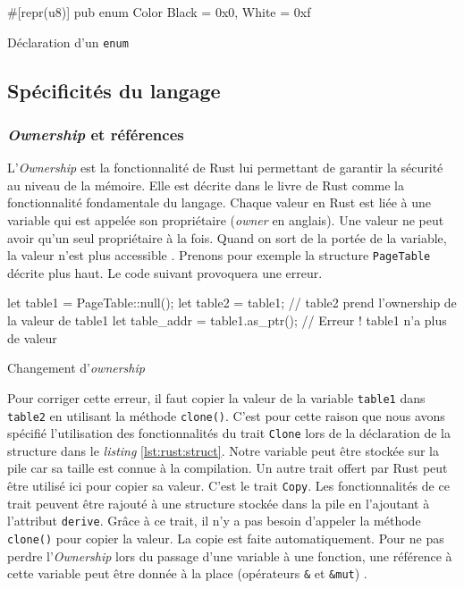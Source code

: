 \begin{code}
\begin{rustcode}
#[repr(u8)]
pub enum Color {
    Black = 0x0,
    White = 0xf
}
\end{rustcode}
\caption{Déclaration d'un \texttt{enum}}
\label{lst:rust:enum}
\end{code} \bigbreak


\subsection{Spécificités du langage}
\subsubsection{\textit{Ownership} et références}
L'\textit{Ownership} est la fonctionnalité de Rust lui permettant de garantir la
sécurité au niveau de la mémoire. Elle est décrite dans le livre de Rust comme
la fonctionnalité fondamentale du langage. Chaque valeur en Rust est liée à une
variable qui est appelée son propriétaire (\textit{owner} en anglais). Une valeur
ne peut avoir qu'un seul propriétaire à la fois. Quand on sort de la portée de
la variable, la valeur n'est plus accessible \cite{ref2}. Prenons pour exemple
la structure \texttt{PageTable} décrite plus haut. Le code suivant
provoquera une erreur.

\begin{code}
\begin{rustcode}
let table1 = PageTable::null();
let table2 = table1;              // table2 prend l'ownership de la valeur de table1
let table_addr = table1.as_ptr(); // Erreur ! table1 n'a plus de valeur
\end{rustcode}
\caption{Changement d'\textit{ownership}}
\label{lst:rust:ownership}
\end{code} \bigbreak

Pour corriger cette erreur, il faut copier la valeur de la variable \texttt{table1}
dans \texttt{table2} en utilisant la méthode \texttt{clone()}.
C'est pour cette raison que nous avons spécifié l'utilisation des fonctionnalités
du trait \texttt{Clone} lors de la déclaration de la structure dans
le \textit{listing} \ref{lst:rust:struct}. Notre variable peut être stockée sur
la pile car sa taille est connue à la compilation. Un autre trait
offert par Rust peut être utilisé ici pour copier sa valeur. C'est le trait
\texttt{Copy}. Les fonctionnalités de ce trait
peuvent être rajouté à une structure stockée dans la pile en l'ajoutant à l'attribut
\texttt{derive}. Grâce à ce trait, il n'y a pas besoin
d'appeler la méthode \texttt{clone()} pour copier la valeur. La copie
est faite automatiquement. Pour ne pas perdre l'\textit{Ownership} lors du passage
d'une variable à une fonction, une référence à cette variable peut être donnée
à la place (opérateurs \texttt{&} et \texttt{&mut}) \cite{ref2}.

